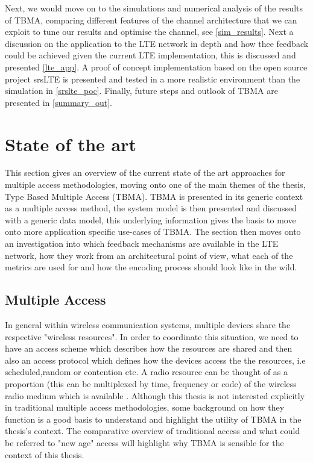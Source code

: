 \documentclass{article}
\begin{document}
Next, we would move on to the simulations and numerical analysis of the results of TBMA, comparing different features of the channel architecture that we can exploit to tune our results and optimise the channel, see \cref{sim_results}. Next a discussion on the application to the LTE network in depth and how thee feedback could be achieved given the current LTE implementation, this is discussed and presented \cref{lte_app}. A proof of concept implementation based on the open source project srsLTE is presented and tested in a more realistic environment than the simulation in \cref{srslte_poc}. Finally, future steps and outlook of TBMA are presented in \cref{summary_out}. 





\section{State of the art} \label{sota}
This section gives an overview of the current state of the art approaches for multiple access methodologies, moving onto one of the main themes of the thesis, Type Based Multiple Access (TBMA). TBMA is presented in its generic context as a multiple access method, the system model is then presented and discussed with a generic data model, this underlying information gives the basis to move onto more application specific use-cases of TBMA. 
The section then moves onto an investigation into which feedback mechanisms are available in the LTE network, how they work from an architectural point of view, what each of the metrics are used for and how the encoding process should look like in the wild.

\subsection{Multiple Access}

In general within wireless communication systems, multiple devices share the respective "wireless resources". In order to coordinate this situation, we need to have an access scheme which describes how the resources are shared and then also an access protocol which defines how the devices access the the resources, i.e scheduled,random or contention etc. A radio resource can be thought of as a proportion (this can be multiplexed by time, frequency or code) of the wireless radio medium which is available \cite{access_tech}. Although this thesis is not interested explicitly in traditional multiple access methodologies, some background on how they function is a good basis to understand and highlight the utility of TBMA in the thesis's context. The comparative overview of traditional access and what could be referred to "new age" access will highlight why TBMA is sensible for the context of this thesis. 
\end{document}
